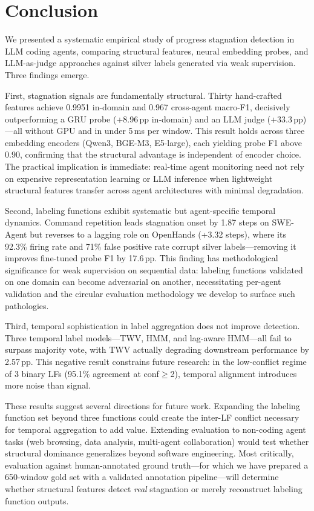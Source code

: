 \section{Conclusion}
\label{sec:conclusion}

We presented a systematic empirical study of progress stagnation detection in LLM coding agents, comparing structural features, neural embedding probes, and LLM-as-judge approaches against silver labels generated via weak supervision.
Three findings emerge.

First, stagnation signals are fundamentally structural.
Thirty hand-crafted features achieve 0.9951 in-domain and 0.967 cross-agent macro-F1, decisively outperforming a GRU probe (+8.96\,pp in-domain) and an LLM judge (+33.3\,pp)---all without GPU and in under 5\,ms per window.
This result holds across three embedding encoders (Qwen3, BGE-M3, E5-large), each yielding probe F1 above 0.90, confirming that the structural advantage is independent of encoder choice.
The practical implication is immediate: real-time agent monitoring need not rely on expensive representation learning or LLM inference when lightweight structural features transfer across agent architectures with minimal degradation.

Second, labeling functions exhibit systematic but agent-specific temporal dynamics.
Command repetition leads stagnation onset by 1.87 steps on SWE-Agent but reverses to a lagging role on OpenHands (+3.32 steps), where its 92.3\% firing rate and 71\% false positive rate corrupt silver labels---removing it improves fine-tuned probe F1 by 17.6\,pp.
This finding has methodological significance for weak supervision on sequential data: labeling functions validated on one domain can become adversarial on another, necessitating per-agent validation and the circular evaluation methodology we develop to surface such pathologies.

Third, temporal sophistication in label aggregation does not improve detection.
Three temporal label models---TWV, HMM, and lag-aware HMM---all fail to surpass majority vote, with TWV actually degrading downstream performance by 2.57\,pp.
This negative result constrains future research: in the low-conflict regime of 3 binary LFs (95.1\% agreement at conf${\geq}$2), temporal alignment introduces more noise than signal.

These results suggest several directions for future work.
Expanding the labeling function set beyond three functions could create the inter-LF conflict necessary for temporal aggregation to add value.
Extending evaluation to non-coding agent tasks (web browsing, data analysis, multi-agent collaboration) would test whether structural dominance generalizes beyond software engineering.
Most critically, evaluation against human-annotated ground truth---for which we have prepared a 650-window gold set with a validated annotation pipeline---will determine whether structural features detect \emph{real} stagnation or merely reconstruct labeling function outputs.
